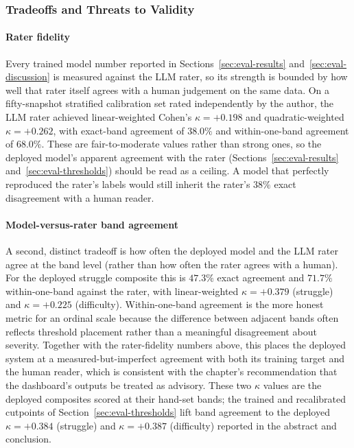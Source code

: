 \subsubsection{Tradeoffs and Threats to Validity} \label{sec:eval-tradeoffs}

\paragraph{Rater fidelity}
Every trained model number reported in Sections~\ref{sec:eval-results} and~\ref{sec:eval-discussion} is measured against the LLM rater, so its strength is bounded by how well that rater itself agrees with a human judgement on the same data. On a fifty-snapshot stratified calibration set rated independently by the author, the LLM rater achieved linear-weighted Cohen's $\kappa = +0.198$ and quadratic-weighted $\kappa = +0.262$, with exact-band agreement of $38.0\%$ and within-one-band agreement of $68.0\%$. These are fair-to-moderate values rather than strong ones, so the deployed model's apparent agreement with the rater (Sections~\ref{sec:eval-results} and~\ref{sec:eval-thresholds}) should be read as a ceiling. A model that perfectly reproduced the rater's labels would still inherit the rater's $38\%$ exact disagreement with a human reader.

\paragraph{Model-versus-rater band agreement}
A second, distinct tradeoff is how often the deployed model and the LLM rater agree at the band level (rather than how often the rater agrees with a human). For the deployed struggle composite this is $47.3\%$ exact agreement and $71.7\%$ within-one-band against the rater, with linear-weighted $\kappa = +0.379$ (struggle) and $\kappa = +0.225$ (difficulty). Within-one-band agreement is the more honest metric for an ordinal scale because the difference between adjacent bands often reflects threshold placement rather than a meaningful disagreement about severity. Together with the rater-fidelity numbers above, this places the deployed system at a measured-but-imperfect agreement with both its training target and the human reader, which is consistent with the chapter's recommendation that the dashboard's outputs be treated as advisory. These two $\kappa$ values are the deployed composites scored at their hand-set bands; the trained and recalibrated cutpoints of Section~\ref{sec:eval-thresholds} lift band agreement to the deployed $\kappa = +0.384$ (struggle) and $\kappa = +0.387$ (difficulty) reported in the abstract and conclusion.


